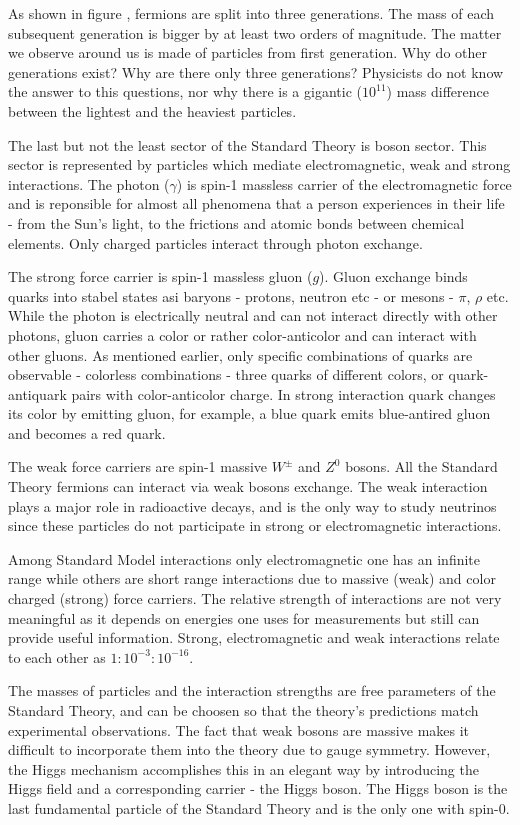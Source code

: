 As shown in figure , fermions are split into three generations. The mass of each 
subsequent generation is bigger by at least two orders of magnitude. The matter we observe 
around us is made of particles from first generation. Why do other generations exist? Why are
there only three generations? Physicists do not know the answer to this questions, nor 
why there is a gigantic ($10^{11}$) mass difference between the lightest and the heaviest particles. 

The last but not the least sector of the Standard Theory is boson sector. This sector is 
represented by particles which mediate electromagnetic, weak and strong interactions. The photon
($\gamma$) is spin-1 massless carrier of the electromagnetic force and is reponsible for almost all phenomena 
that a person experiences in their life - from the Sun's light, to the frictions and atomic bonds between 
chemical elements. Only charged particles interact through photon exchange.

The strong force carrier is spin-1 massless gluon ($g$). Gluon exchange binds quarks into stabel states asi
baryons - protons, neutron etc - or mesons - $\pi$, $\rho$ etc. While the photon is electrically
neutral and can not interact directly with other photons, gluon carries a color or
rather color-anticolor and can interact with other gluons. As mentioned earlier, only specific 
combinations of quarks are observable - colorless combinations - three quarks of different colors,
or quark-antiquark pairs with color-anticolor charge. In strong interaction quark changes its color
by emitting gluon, for example, a blue quark emits blue-antired gluon and becomes a red quark.

The weak force carriers are spin-1 massive $W^\pm$ and $Z^0$ bosons. All the Standard Theory fermions 
can interact via weak bosons exchange. The weak interaction plays a major role in radioactive decays, and
is the only way to study neutrinos since these particles do not participate in strong or
electromagnetic interactions.

Among Standard Model interactions only electromagnetic one has an infinite range while others
are short range interactions due to massive (weak) and color charged (strong) force carriers. 
The relative strength of interactions are not very meaningful as it depends on energies one uses
for measurements but still can provide useful information. Strong, electromagnetic and weak interactions
relate to each other as $1:10^{-3}:10^{-16}$.

The masses of particles and the interaction strengths are free parameters of the Standard Theory, and
can be choosen so that the theory's predictions match experimental observations. The fact that weak bosons
are massive makes it difficult to incorporate them into the theory due to gauge symmetry. However, the
Higgs mechanism accomplishes this in an elegant way by introducing the Higgs field and a corresponding
carrier - the Higgs boson. The Higgs boson is the last fundamental particle of the Standard Theory and
is the only one with spin-0.

